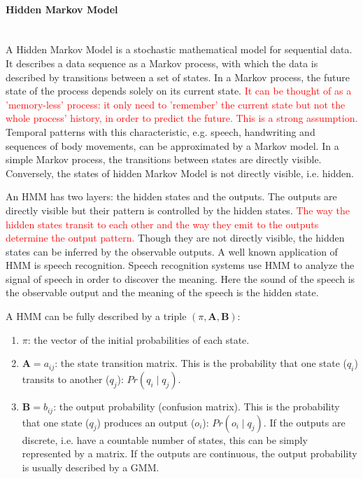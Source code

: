 \paragraph{Hidden Markov Model} ~\\
A Hidden Markov Model is a stochastic mathematical model for sequential data. It describes a data sequence as a Markov process, with which the data is described by transitions between a set of states. In a Markov process, the future state of the process depends solely on its current state. \textcolor{red}{It can be thought of as a 'memory-less' process: it only need to 'remember' the current state but not the whole process' history, in order to predict the future. This is a strong assumption.}
Temporal patterns with this characteristic, e.g. speech, handwriting and sequences of body movements, can be approximated by a Markov model. In a simple Markov process, the transitions between states are directly visible. Conversely, the states of hidden Markov Model is not directly visible, i.e. hidden.

An HMM has two layers: the hidden states and the outputs. The outputs are directly visible but their pattern is controlled by the hidden states. \textcolor{red}{The way the hidden states transit to each other and the way they emit to the outputs determine the output pattern.} Though they are not directly visible, the hidden states can be inferred by the observable outputs. A well known application of HMM is speech recognition. Speech recognition systems use HMM to analyze the signal of speech in order to discover the meaning. Here the sound of the speech is the observable output and the meaning of the speech is the hidden state.


A HMM can be fully described by a triple $\left(\pi,\boldsymbol{A},\boldsymbol{B}\right)$:

\begin{enumerate}
\item $\pi$: the vector of the initial probabilities of each state.
\item $\boldsymbol{A}={a_{ij}}$: the state transition matrix. This is the probability that one state ($q_i$) transits to another ($q_j$): $Pr\left(q_i{\mid}q_j\right)$.
\item $\boldsymbol{B}={b_{ij}}$: the output probability (confusion matrix). This is the probability that one state ($q_j$) produces an output ($o_i$): $Pr\left(o_i{\mid}q_{j}\right)$. If the outputs are discrete, i.e. have a countable number of states, this can be simply represented by a matrix. If the outputs are continuous, the output probability is usually described by a GMM.
\end{enumerate}

